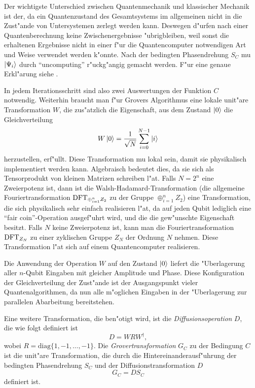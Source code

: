     Der wichtigste Unterschied zwischen Quantenmechanik und klassischer Mechanik ist der, da\3 ein Quantenzustand des Gesamtsystems im allgemeinen nicht in die Zust"ande
    von Untersystemen zerlegt werden kann. Deswegen d"urfen nach einer Quantenberechnung keine Zwischenergebnisse "ubrigbleiben, weil sonst die erhaltenen Ergebnisse nicht
    in einer f"ur die Quantencomputer notwendigen Art und Weise verwendet werden k"onnte. Nach der bedingten Phasendrehung $S_C$ mu\3 $\left| \Psi_i \right>$
    durch "`uncomputing"' r"uckg"angig gemacht werden. F"ur eine genaue Erkl"arung siehe \cite{kitaev}.
    
    In jedem Iterationsschritt sind also zwei Auswertungen der Funktion $C$ notwendig.
    Weiterhin braucht man f"ur Grovers Algorithmus eine lokale unit"are Transformation $W$, die zus"atzlich die Eigenschaft, aus dem Zustand $\left| 0 \right>$ die Gleichverteilung 
    $$ W\left| 0 \right> = \frac{1}{\sqrt{N}} \sum_{i=0}^{N-1} \left| i \right> $$  
    herzustellen, erf"ullt. Diese Transformation mu\3 lokal sein, damit sie physikalisch implementiert werden kann. 
    Algebraisch bedeutet dies, da\3 sie sich als Tensorprodukt von kleinen Matrizen schreiben l"a\3t. 
    Falls $N=2^n$ eine Zweierpotenz ist, dann ist die Walsh-Hadamard-Transformation (die allgemeine Fouriertransformation $\mbox{DFT}_{\oplus_{i=1}^{n} Z_2}$ 
    zu der Gruppe $\oplus_{i=1}^{n} Z_2$) eine Transformation, die sich physikalisch sehr einfach realisieren l"a\3t, da auf jeden Qubit  
    lediglich eine "`fair coin"'-Operation ausgef"uhrt wird, und die die gew"unschte Eigenschaft besitzt. Falls $N$ keine Zweierpotenz ist, kann man die
    Fouriertransformation $\mbox{DFT}_{Z_N}$ zu einer zyklischen Gruppe $Z_N$ der Ordnung $N$ nehmen. Diese Transformation l"a\3t sich auf einem 
    Quantencomputer realisieren.
    
    Die Anwendung der Operation $W$ auf den Zustand $\left| 0 \right>$ liefert die "Uberlagerung aller $n$-Qubit Eingaben mit gleicher Amplitude und  
    Phase. Diese Konfiguration der Gleichverteilung der Zust"ande ist der Ausgangspunkt vieler Quantenalgorithmen, da nun alle m"oglichen Eingaben in der  
    "Uberlagerung zur parallelen Abarbeitung bereitstehen. 
    
    Eine weitere Transformation, die ben"otigt wird, ist die {\em Diffusionsoperation} $D$, die wie folgt definiert ist 
    $$ D = W R W^{\dagger}, $$ 
    wobei $R = \mbox{diag}\{1,-1,\ldots,-1\}$. Die {\em Grovertransformation} $G_C$ zu der Bedingung $C$ ist die unit"are Transformation, die durch
    die Hintereinanderausf"uhrung der bedingten Phasendrehung $S_C$ und der Diffusionstransformation $D$ 
    $$ G_C = D S_C $$ 
    definiert ist.
   
